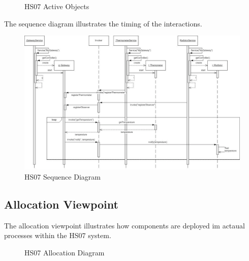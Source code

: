 \documentclass[a4paper,10pt]{article}
\begin{document}
\begin{figure}[!htb]
\caption{HS07 Active Objects}
\label{fig:cc_ao}
\end{figure}
The sequence diagram illustrates the timing of the interactions.
\begin{figure}[!htb]
\includegraphics[viewport=0 10 500 650,scale=0.3]{figures/sequence.pdf}
\caption{HS07 Sequence Diagram}
\label{fig:sequence}
\end{figure}


\subsection{Allocation Viewpoint}

The allocation viewpoint illustrates how components are deployed im actaual processes
within the HS07 system.

\begin{figure}[!htb]
\caption{HS07 Allocation Diagram}
\label{fig:allocation}
\end{figure}
\end{document}
